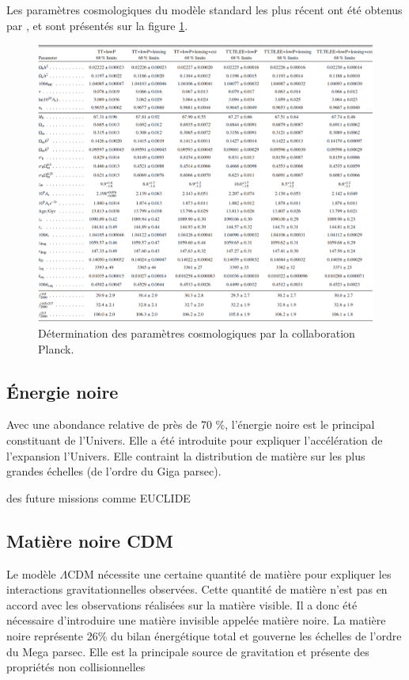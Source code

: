 Les paramètres cosmologiques du modèle standard les plus récent ont été obtenus par \cite{planck_collaboration_planck_2016}, et sont présentés sur la figure \ref{fig:planck_parameters}.





\begin{figure}[bth]
        \includegraphics[width=.95\linewidth]{img/01/table_planck.pdf} 
        \caption{Détermination des paramètres cosmologiques par la collaboration Planck.}
 		\label{fig:planck_parameters}
\end{figure}



\subsection{Énergie noire}
Avec une abondance relative de près de 70 \%, l'énergie noire est le principal constituant de l'Univers.
Elle a été introduite pour expliquer l'accélération de l'expansion l'Univers.
Elle contraint la distribution de matière sur les plus grandes échelles (de l'ordre du Giga parsec).

des future missions comme EUCLIDE %


\subsection{Matière noire CDM}
Le modèle $\Lambda$CDM nécessite une certaine quantité de matière pour expliquer les interactions gravitationnelles observées.
Cette quantité de matière n'est pas en accord avec les observations réalisées sur la matière visible.
Il a donc été nécessaire d’introduire une matière invisible appelée matière noire.
La matière noire représente 26\% du bilan énergétique total et gouverne les échelles de l'ordre du Mega parsec.
Elle est la principale source de gravitation et présente des propriétés non collisionnelles



